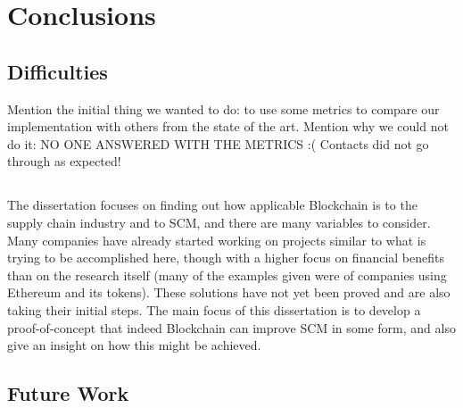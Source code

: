 \chapter{Conclusions}
\label{chap:conclusions}
\minitoc \mtcskip \noindent

\section{Difficulties}
Mention the initial thing we wanted to do: to use some metrics to compare our implementation with others from the state of the art.
Mention why we could not do it: NO ONE ANSWERED WITH THE METRICS :( Contacts did not go through as expected!

\section{}


The dissertation focuses on finding out how applicable Blockchain is to the supply chain industry and to SCM, and there are many variables to consider. Many companies have already started working on projects similar to what is trying to be accomplished here, though with a higher focus on financial benefits than on the research itself (many of the examples given were of companies using Ethereum and its tokens). These solutions have not yet been proved and are also taking their initial steps. The main focus of this dissertation is to develop a proof-of-concept that indeed Blockchain can improve SCM in some form, and also give an insight on how this might be achieved. 

\section{Future Work}

